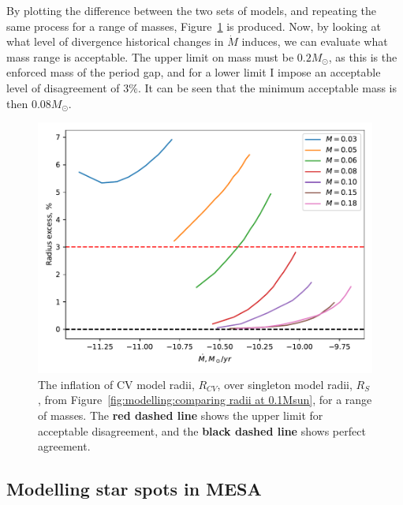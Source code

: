 By plotting the difference between the two sets of models, and repeating the same process for a range of masses, Figure~\ref{fig:modelling:comparing radii over a range of masses} is produced. Now, by looking at what level of divergence historical changes in $\dot M$ induces, we can evaluate what mass range is acceptable. The upper limit on mass must be $0.2 M_\odot$, as this is the enforced mass of the period gap, and for a lower limit I impose an acceptable level of disagreement of $3\%$. It can be seen that the minimum acceptable mass is then $0.08 M_\odot$.
\begin{figure}
    \centering
    \includegraphics[width=\textwidth]{figures/modelling/compare_multiple_mass_with_CV_K11_fig1a.pdf}
    \caption{The inflation of CV model radii, $R_{CV}$, over singleton model radii, $R_S$, from Figure~\ref{fig:modelling:comparing radii at 0.1Msun}, for a range of masses. The {\bf red dashed line} shows the upper limit for acceptable disagreement, and the {\bf black dashed line} shows perfect agreement.}
    \label{fig:modelling:comparing radii over a range of masses}
\end{figure}


\subsection{Modelling star spots in MESA}
\label{sect:modelling:starspots in MESA}

